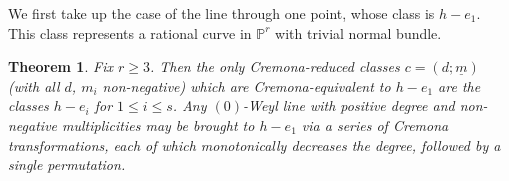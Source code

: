 \documentclass[12pt]{article}
\numberwithin{equation}{section}
\newtheorem{theorem}[equation]{Theorem}
\numberwithin{equation}{section}
\numberwithin{subeq}{equation}
\def\bbP{\mathbb{P}}
\begin{document}
We first take up the case of the line through one point,  whose class is $h-e_1$.
This class represents a rational curve in $\bbP^r$ with trivial normal bundle.

\begin{theorem}\label{thm:0weyllines}
Fix $r\geq 3$.
Then the only Cremona-reduced classes $c = (d;\underline{m})$
(with all $d$, $m_i$ non-negative)
which are Cremona-equivalent to $h-e_1$
are the classes $h-e_i$ for $1 \leq i \leq s$.
Any $(0)$-Weyl line with positive degree and non-negative multiplicities
may be brought to $h-e_1$ via a series of Cremona transformations,
each of which monotonically decreases the degree,
followed by a single permutation.
\end{theorem}
\end{document}
